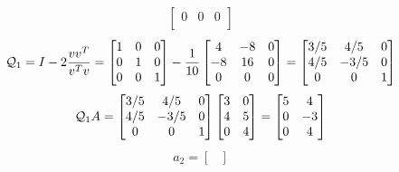 \documentclass{article}
\begin{document}
\begin{enumerate}
\begin{enumerate}
{\begin{align*}
\begin{bmatrix}
            0 & 0 & 0\\
          \end{bmatrix}
      \end{align*}
      \begin{align*}
        \mathcal{Q}_1 &= I - 2 \frac{vv^T}{v^Tv} 
        = 
        \begin{bmatrix}
        1 & 0 & 0 \\
        0 & 1 & 0 \\
        0 & 0 & 1 \\
        \end{bmatrix} 
        -  \frac{1}{10}
        \begin{bmatrix}
            4 & -8 & 0 \\
            -8 & 16 & 0 \\
            0 & 0 & 0\\
        \end{bmatrix} 
          = 
        \begin{bmatrix}
            3/5 & 4/5 & 0 \\
            4/5 & -3/5 & 0 \\
            0 & 0 & 1\\
        \end{bmatrix} \\
      \end{align*}
      \begin{align*}
          \mathcal{Q}_1 A = 
          \begin{bmatrix}
            3/5 & 4/5 & 0 \\
            4/5 & -3/5 & 0 \\
            0 & 0 & 1\\
        \end{bmatrix} 
        \begin{bmatrix}
            3 & 0 \\
            4 & 5 \\
            0 & 4 \\
        \end{bmatrix}
        = 
        \begin{bmatrix}
            5 & 4 \\
            0 & -3 \\
            0 & 4 \\
        \end{bmatrix}
      \end{align*}
      \begin{align*}
          a_2 = 
          \begin{bmatrix}

\end{bmatrix}
\end{align*}}
\end{enumerate}
\end{enumerate}
\end{document}
